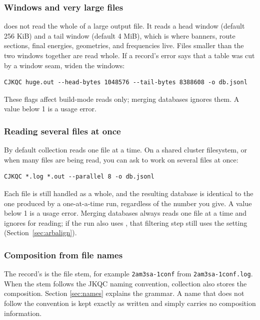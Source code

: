 \subsubsection*{Windows and very large files}

\CJKQC{} does not read the whole of a large output file. It reads a head
window (default 256 KiB) and a tail window (default 4 MiB), which is where
banners, route sections, final energies, geometries, and frequencies live.
Files smaller than the two windows together are read whole. If a record's
error says that a table was cut by a window seam, widen the windows:

\begin{verbatim}
CJKQC huge.out --head-bytes 1048576 --tail-bytes 8388608 -o db.jsonl
\end{verbatim}

These flags affect build-mode reads only; merging databases ignores them.
A value below 1 is a usage error.

\subsubsection*{Reading several files at once}

By default collection reads one file at a time. On a shared cluster
filesystem, or when many files are being read, you can ask \CJKQC{} to work
on several files at once:

\begin{verbatim}
CJKQC *.log *.out --parallel 8 -o db.jsonl
\end{verbatim}

Each file is still handled as a whole, and the resulting database is identical
to the one produced by a one-at-a-time run, regardless of the number you give.
A value below 1 is a usage error. Merging databases always reads one file at a
time and ignores  for reading; if the run also uses
, that filtering step still uses the setting
(Section~\ref{sec:arbalign}).

\subsubsection*{Composition from file names}

The record's  is the file stem, for example \texttt{2am3sa-1conf}
from \texttt{2am3sa-1conf.log}. When the stem follows the JKQC naming
convention, collection also stores the composition. Section
\ref{sec:names} explains the grammar. A name that does not follow the
convention is kept exactly as written and simply carries no composition
information.

